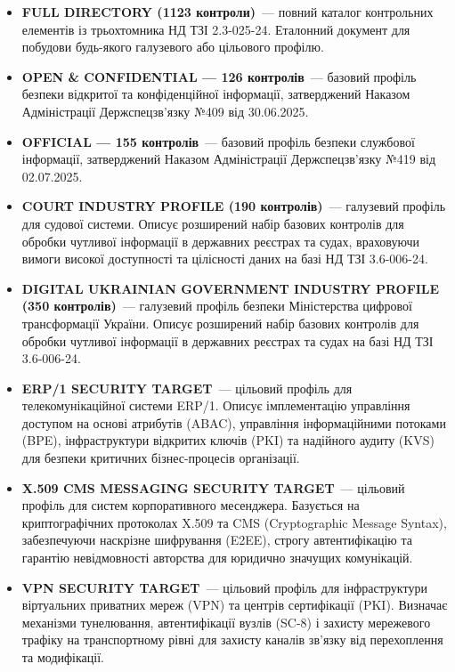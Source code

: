 \begin{itemize}
    \item \textbf{FULL DIRECTORY (1123 контроли)}~--- повний каталог контрольних елементів
          із трьохтомника НД ТЗІ 2.3-025-24. Еталонний документ для побудови будь-якого
          галузевого або цільового профілю.

    \item \textbf{OPEN \& CONFIDENTIAL --- 126 контролів}~--- базовий профіль безпеки відкритої
          та конфіденційної інформації, затверджений Наказом Адміністрації Держспецзв'язку №409
          від 30.06.2025.

    \item \textbf{OFFICIAL --- 155 контролів}~--- базовий профіль безпеки службової інформації,
          затверджений Наказом Адміністрації Держспецзв'язку №419 від 02.07.2025.

    \item \textbf{COURT INDUSTRY PROFILE (190 контролів)}~--- галузевий профіль для судової
          системи. Описує розширений набір базових контролів для обробки чутливої інформації в
          державних реєстрах та судах, враховуючи вимоги високої доступності та цілісності даних
          на базі НД ТЗІ 3.6-006-24.

    \item \textbf{DIGITAL UKRAINIAN GOVERNMENT INDUSTRY PROFILE (350 контролів)}~---
          галузевий профіль безпеки Міністерства цифрової трансформації України. Описує
          розширений набір базових контролів для обробки чутливої інформації в державних реєстрах
          та судах на базі НД ТЗІ 3.6-006-24.

    \item \textbf{ERP/1 SECURITY TARGET}~--- цільовий профіль для телекомунікаційної системи
          ERP/1. Описує імплементацію управління доступом на основі атрибутів (ABAC), управління
          інформаційними потоками (BPE), інфраструктури відкритих ключів (PKI) та надійного
          аудиту (KVS) для безпеки критичних бізнес-процесів організації.

    \item \textbf{X.509 CMS MESSAGING SECURITY TARGET}~--- цільовий профіль для систем
          корпоративного месенджера. Базується на криптографічних протоколах X.509 та CMS
          (Cryptographic Message Syntax), забезпечуючи наскрізне шифрування (E2EE), строгу
          автентифікацію та гарантію невідмовності авторства для юридично значущих комунікацій.

    \item \textbf{VPN SECURITY TARGET}~--- цільовий профіль для інфраструктури віртуальних
          приватних мереж (VPN) та центрів сертифікації (PKI). Визначає механізми тунелювання,
          автентифікації вузлів (SC-8) і захисту мережевого трафіку на транспортному рівні для
          захисту каналів зв'язку від перехоплення та модифікації.
\end{itemize}

